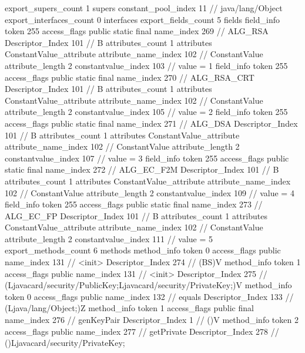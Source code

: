 {{{			export_supers_count	1
			supers {
				constant_pool_index	11		// java/lang/Object
			}
			export_interfaces_count	0
			interfaces {
			}
			export_fields_count	5
			fields {
			field_info {
				token	255
				access_flags	public static final
				name_index	269		// ALG_RSA
				Descriptor_Index	101		// B
				attributes_count	1
				attributes {
				ConstantValue_attribute {
					attribute_name_index	102		// ConstantValue
					attribute_length	2
					constantvalue_index	103		// value = 1
				}
				}
			}
			field_info {
				token	255
				access_flags	public static final
				name_index	270		// ALG_RSA_CRT
				Descriptor_Index	101		// B
				attributes_count	1
				attributes {
				ConstantValue_attribute {
					attribute_name_index	102		// ConstantValue
					attribute_length	2
					constantvalue_index	105		// value = 2
				}
				}
			}
			field_info {
				token	255
				access_flags	public static final
				name_index	271		// ALG_DSA
				Descriptor_Index	101		// B
				attributes_count	1
				attributes {
				ConstantValue_attribute {
					attribute_name_index	102		// ConstantValue
					attribute_length	2
					constantvalue_index	107		// value = 3
				}
				}
			}
			field_info {
				token	255
				access_flags	public static final
				name_index	272		// ALG_EC_F2M
				Descriptor_Index	101		// B
				attributes_count	1
				attributes {
				ConstantValue_attribute {
					attribute_name_index	102		// ConstantValue
					attribute_length	2
					constantvalue_index	109		// value = 4
				}
				}
			}
			field_info {
				token	255
				access_flags	public static final
				name_index	273		// ALG_EC_FP
				Descriptor_Index	101		// B
				attributes_count	1
				attributes {
				ConstantValue_attribute {
					attribute_name_index	102		// ConstantValue
					attribute_length	2
					constantvalue_index	111		// value = 5
				}
				}
			}
			}
			export_methods_count	6
			methods {
				method_info {
					token	0
					access_flags	public
					name_index	131		// <init>
					Descriptor_Index	274		// (BS)V
				}
				method_info {
					token	1
					access_flags	public
					name_index	131		// <init>
					Descriptor_Index	275		// (Ljavacard/security/PublicKey;Ljavacard/security/PrivateKey;)V
				}
				method_info {
					token	0
					access_flags	public
					name_index	132		// equals
					Descriptor_Index	133		// (Ljava/lang/Object;)Z
				}
				method_info {
					token	1
					access_flags	public final
					name_index	276		// genKeyPair
					Descriptor_Index	1		// ()V
				}
				method_info {
					token	2
					access_flags	public
					name_index	277		// getPrivate
					Descriptor_Index	278		// ()Ljavacard/security/PrivateKey;
}}}}}
